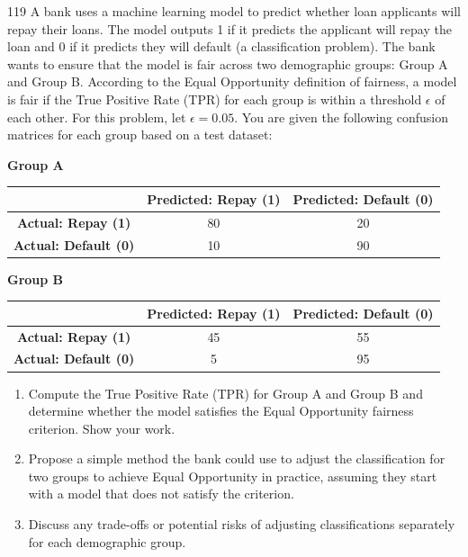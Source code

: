 \documentclass[11pt]{article}
\begin{document}
\begin{problem}{11}{9}
A bank uses a machine learning model to predict whether loan applicants will repay their loans. The model outputs 1 if it predicts the applicant will repay the loan and 0 if it predicts they will default (a classification problem). The bank wants to ensure that the model is fair across two demographic groups: Group A and Group B. According to the Equal Opportunity definition of fairness, a model is fair if the True Positive Rate (TPR) for each group is within a threshold $\epsilon$ of each other. For this problem, let $\epsilon=0.05$. You are given the following confusion matrices for each group based on a test dataset:

\textbf{Group A}
\begin{center}
\begin{tabular}{c|cc}
& \textbf{Predicted: Repay (1)} & \textbf{Predicted: Default (0)} \\ \hline
\textbf{Actual: Repay (1)} & 80 & 20 \\
\textbf{Actual: Default (0)} & 10 & 90 \\
\end{tabular}
\end{center}

\textbf{Group B}
\begin{center}
\begin{tabular}{c|cc}
& \textbf{Predicted: Repay (1)} & \textbf{Predicted: Default (0)} \\ \hline
\textbf{Actual: Repay (1)} & 45 & 55 \\
\textbf{Actual: Default (0)} & 5 & 95 \\
\end{tabular}
\end{center}

\begin{enumerate}[label=(\alph*)]
\item Compute the True Positive Rate (TPR) for Group A and Group B and determine whether the model satisfies the Equal Opportunity fairness criterion. Show your work.
\item Propose a simple method the bank could use to adjust the classification for two groups to achieve Equal Opportunity in practice, assuming they start with a model that does not satisfy the criterion.
\item Discuss any trade-offs or potential risks of adjusting classifications separately for each demographic group.
\end{enumerate}
\end{problem}
\end{document}
